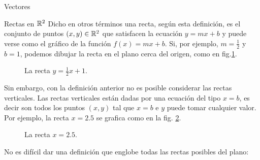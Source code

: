 \begin{chapter}{Vectores}
\begin{section}{Rectas en $\mathbb R^2$}
    Dicho en otros términos una recta,  según esta definición, es el conjunto de puntos $(x,y) \in \mathbb R^2$ que satisfacen la ecuación $y = m x + b$ y puede verse como el gráfico de la función $f(x) = m x + b$. Si, por ejemplo, $m=\frac12$ y $b=1$, podemos dibujar la recta en el plano cerca del origen, como en fig.\ref{fig-recta-funcion}.
    \begin{figure}[h]
    	\centering
        \caption{La recta $y = \frac12x +1$.}
        \label{fig-recta-funcion}
    \end{figure} 
    
    Sin embargo, con la definición anterior no es posible considerar las rectas verticales. Las rectas verticales están dadas por una ecuación del tipo $x= b$,  es decir son todos los puntos $(x,y)$  tal que $x=b$ e $y$ puede tomar cualquier valor. Por ejemplo, la recta $x=2.5$ se  grafica  como en la fig. \ref{fig-recta-vertical}.
    \begin{figure}[h]
    	\centering
        \caption{La recta $x=2.5$.}
        \label{fig-recta-vertical}
    \end{figure} 
    
    No es difícil dar una definición que englobe todas las rectas posibles del plano:
    

\end{section}
\end{chapter}
